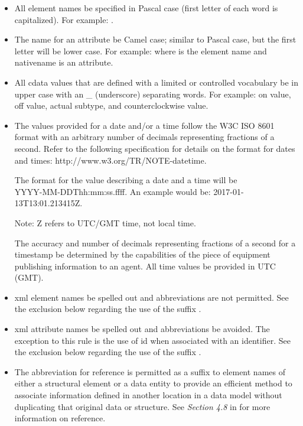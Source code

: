\documentclass{mtconnect}	%
\begin{document}
\begin{itemize}
\item All element names \MUST be specified in Pascal case (first letter of each word is capitalized). For example: .

\item The name for an attribute \MUST be Camel case; similar to Pascal case, but the first letter will be lower case.  For example:  where  is the \gls{element name} and \gls{nativename} is an attribute.

\item All \gls{cdata} values that are defined with a limited or controlled vocabulary \MUST be in upper case with an \_ (underscore) separating words.  For example: \gls{on value}, \gls{off value}, \gls{actual subtype}, and \gls{counterclockwise value}.

\item The values provided for a date and/or a time \MUST follow the W3C ISO 8601 format with an arbitrary number of decimals representing fractions of a second.  Refer to the following specification for details on the format for dates and times:  http://www.w3.org/TR/NOTE-datetime.

The format for the value describing a date and a time will be\\ YYYY-MM-DDThh:mm:ss.ffff. An example would be: 2017-01-13T13:01.213415Z.  

\begin{note}
Note:  Z refers to UTC/GMT time, not local time.

\end{note}

The accuracy and number of decimals representing fractions of a second for a \gls{timestamp} \MUST be determined by the capabilities of the piece of equipment publishing information to an \gls{agent}.  All time values \MUST be provided in UTC (GMT).

\item \gls{xml} element names \MUST be spelled out and abbreviations are not permitted.   See the exclusion below regarding the use of the suffix .

\item \gls{xml} attribute names \SHOULD be spelled out and abbreviations \SHOULD be avoided.  The exception to this rule is the use of \gls{id} when associated with an identifier.  See the exclusion below regarding the use of the suffix .

\item The abbreviation  for \gls{reference} is permitted as a suffix to element names of either a \gls{structural element} or a \gls{data entity} to provide an efficient method to associate information defined in another location in a \gls{data model} without duplicating that original data or structure.  See \textit{Section 4.8} in  for more information on \gls{reference}.
\end{itemize}
\end{document}
